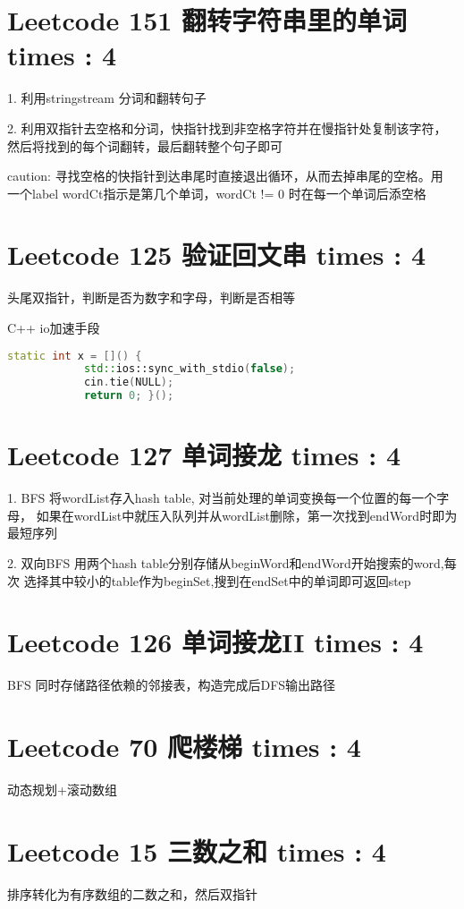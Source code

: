 \documentclass[UTF8]{ctexart}
\begin{document}
\section{Leetcode 151 翻转字符串里的单词 times : 4}
1. 利用stringstream 分词和翻转句子

2. 利用双指针去空格和分词，快指针找到非空格字符并在慢指针处复制该字符，
然后将找到的每个词翻转，最后翻转整个句子即可

caution: 寻找空格的快指针到达串尾时直接退出循环，从而去掉串尾的空格。用
一个label wordCt指示是第几个单词，wordCt != 0 时在每一个单词后添空格

\section{Leetcode 125 验证回文串 times : 4}
头尾双指针，判断是否为数字和字母，判断是否相等

C++ io加速手段
\begin{framed}
	\begin{lstlisting}[language=C++]
		static int x = []() {
			std::ios::sync_with_stdio(false);
			cin.tie(NULL);
			return 0; }();
	\end{lstlisting}
\end{framed}

\section{Leetcode 127 单词接龙 times : 4}
1. BFS 将wordList存入hash table, 对当前处理的单词变换每一个位置的每一个字母，
如果在wordList中就压入队列并从wordList删除，第一次找到endWord时即为最短序列

2. 双向BFS 用两个hash table分别存储从beginWord和endWord开始搜索的word,每次
选择其中较小的table作为beginSet,搜到在endSet中的单词即可返回step

\section{Leetcode 126 单词接龙II times : 4}
BFS 同时存储路径依赖的邻接表，构造完成后DFS输出路径

\section{Leetcode 70 爬楼梯 times : 4}
动态规划+滚动数组

\section{Leetcode 15 三数之和 times : 4}
排序转化为有序数组的二数之和，然后双指针
\end{document}
